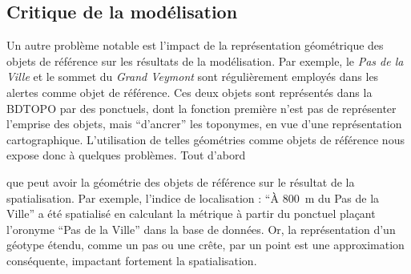 \subsection{Critique de la modélisation}
\label{subsec:9-2-3}


Un autre problème notable est l'impact de la représentation
géométrique des objets de référence sur les résultats de la
modélisation. Par exemple, le \emph{Pas de la Ville} et le sommet du
\emph{Grand Veymont} sont régulièrement employés dans les alertes
comme objet de référence. Ces deux objets sont représentés dans la
BDTOPO par des ponctuels, dont la fonction première n'est pas de
représenter l'emprise des objets, mais \enquote{d'ancrer} les
toponymes, en vue d'une représentation cartographique. L'utilisation
de telles géométries comme objets de référence nous expose donc à
quelques problèmes.
%
Tout d'abord


que peut avoir la géométrie des
objets de référence sur le résultat de la spatialisation. Par exemple,
l'indice de localisation : \enquote{À \SI{800}{\meter} du Pas de la
  Ville} a été spatialisé en calculant la métrique
 à partir du ponctuel plaçant l'oronyme
\enquote{Pas de la Ville} dans la base de données. Or, la
représentation d'un géotype étendu, comme un pas ou une crête, par un
point est une approximation conséquente, impactant fortement la
spatialisation.

